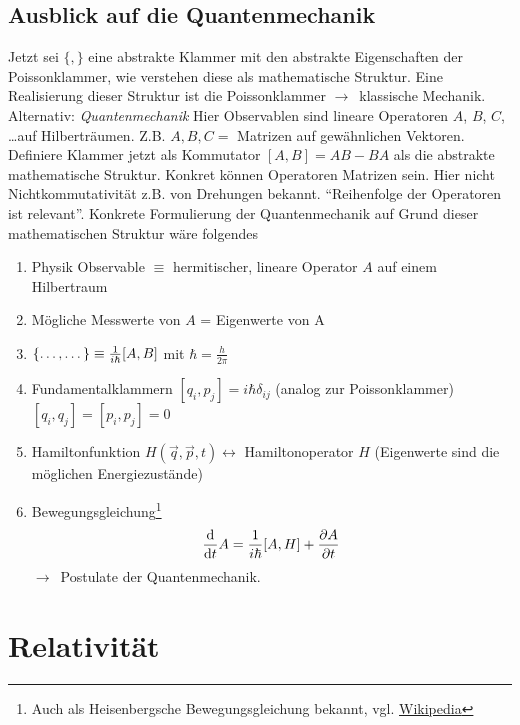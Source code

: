 \documentclass[oneside]{book}
\theoremstyle{definition}
\newcommand{\conseq}{$\rightarrow$~}
\renewcommand{\d}{\mathrm d}
\newcommand{\dd}[1]{\frac{\d}{\d #1}}
\newcommand{\ffpartial}[2]{\frac{\partial #1}{\partial #2}}
\begin{document}
\section{Ausblick auf die Quantenmechanik}
Jetzt sei $\{,\}$ eine abstrakte Klammer mit den abstrakte Eigenschaften der Poissonklammer, wie verstehen diese als mathematische Struktur.
Eine Realisierung dieser Struktur ist die Poissonklammer \conseq klassische Mechanik.
Alternativ: \textit{Quantenmechanik}
Hier Observablen sind lineare Operatoren $A$, $B$, $C$, \dots auf Hilberträumen. Z.B. $A,B,C = $ Matrizen auf gewähnlichen Vektoren. Definiere Klammer jetzt als Kommutator $[A,B] = AB - BA$
als die abstrakte mathematische Struktur. Konkret können Operatoren Matrizen sein. Hier nicht Nichtkommutativität z.B. von Drehungen bekannt. "`Reihenfolge der Operatoren ist relevant"'.
Konkrete Formulierung der Quantenmechanik auf Grund dieser mathematischen Struktur wäre folgendes
\begin{enumerate}
	\item Physik Observable $\equiv$ hermitischer, lineare Operator $A$ auf einem Hilbertraum
	\item Mögliche Messwerte von $A$ = Eigenwerte von A
	\item $\{\dots, \dots\} \equiv \frac{1}{i \hbar} [A, B]$ mit $\hbar = \frac{h}{2 \pi}$
	\item Fundamentalklammern
	$[q_i, p_j] = i \hbar \delta_{ij}$ (analog zur Poissonklammer)\\
	$[q_i, q_j] = [p_i, p_j] = 0$
	\item Hamiltonfunktion $H(\vec{q}, \vec{p}, t) \leftrightarrow $ Hamiltonoperator $H$ (Eigenwerte sind die möglichen Energiezustände)
	\item Bewegungsgleichung\footnote{Auch als Heisenbergsche Bewegungsgleichung bekannt, vgl. \href{https://de.wikipedia.org/wiki/Heisenbergsche_Bewegungsgleichung}{Wikipedia}}
	$$\dd t A = \fihbar [A, H] + \ffpartial{A}{t}$$
	\conseq Postulate der Quantenmechanik.
\end{enumerate}



\chapter{Relativität}
\end{document}
